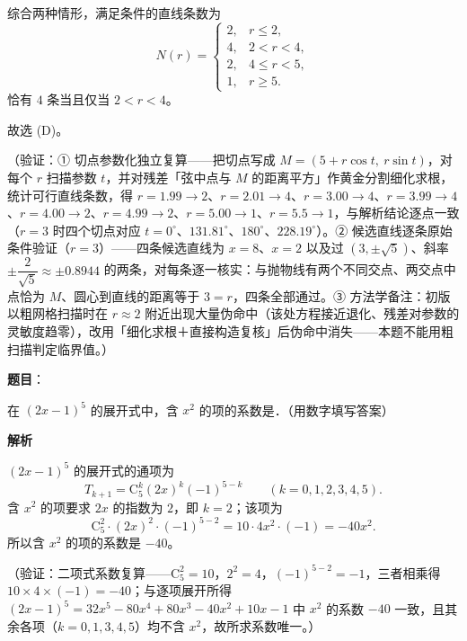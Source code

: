 \begin{answer}
综合两种情形，满足条件的直线条数为
\nopagebreak[4]
\[
N(r)=\begin{cases}
2, & r\leqslant2,\\
4, & 2<r<4,\\
2, & 4\leqslant r<5,\\
1, & r\geqslant5 .
\end{cases}
\]
恰有 \(4\) 条当且仅当 \(2<r<4\)。

故选 (D)。

（验证：① 切点参数化独立复算——把切点写成 \(M=(5+r\cos t,\ r\sin t)\)，对每个 \(r\) 扫描参数 \(t\)，并对残差「弦中点与 \(M\) 的距离平方」作黄金分割细化求根，统计可行直线条数，得 \(r=1.99\to2\)、\(r=2.01\to4\)、\(r=3.00\to4\)、\(r=3.99\to4\)、\(r=4.00\to2\)、\(r=4.99\to2\)、\(r=5.00\to1\)、\(r=5.5\to1\)，与解析结论逐点一致（\(r=3\) 时四个切点对应 \(t=0^{\circ}\)、\(131.81^{\circ}\)、\(180^{\circ}\)、\(228.19^{\circ}\)）。② 候选直线逐条原始条件验证（\(r=3\)）——四条候选直线为 \(x=8\)、\(x=2\) 以及过 \((3,\pm\sqrt{5})\)、斜率 \(\pm\dfrac{2}{\sqrt{5}}\approx\pm0.8944\) 的两条，对每条逐一核实：与抛物线有两个不同交点、两交点中点恰为 \(M\)、圆心到直线的距离等于 \(3=r\)，四条全部通过。③ 方法学备注：初版以粗网格扫描时在 \(r\approx2\) 附近出现大量伪命中（该处方程接近退化、残差对参数的灵敏度趋零），改用「细化求根＋直接构造复核」后伪命中消失——本题不能用粗扫描判定临界值。）


\end{answer}
\begin{answer}

\textbf{题目}：

在 \((2x-1)^5\) 的展开式中，含 \(x^2\) 的项的系数是\gkblank{}．（用数字填写答案）

\textbf{解析}

\((2x-1)^5\) 的展开式的通项为
\nopagebreak[4]
\[
T_{k+1}=\mathrm{C}_5^k(2x)^k(-1)^{5-k}\qquad(k=0,1,2,3,4,5).
\]
含 \(x^2\) 的项要求 \(2x\) 的指数为 \(2\)，即 \(k=2\)；该项为
\nopagebreak[4]
\[
\mathrm{C}_5^2\cdot(2x)^2\cdot(-1)^{5-2}=10\cdot4x^2\cdot(-1)=-40x^2.
\]
所以含 \(x^2\) 的项的系数是 \(-40\)。

（验证：二项式系数复算——\(\mathrm{C}_5^2=10\)，\(2^2=4\)，\((-1)^{5-2}=-1\)，三者相乘得 \(10\times4\times(-1)=-40\)；与逐项展开所得 \((2x-1)^5=32x^5-80x^4+80x^3-40x^2+10x-1\) 中 \(x^2\) 的系数 \(-40\) 一致，且其余各项（\(k=0,1,3,4,5\)）均不含 \(x^2\)，故所求系数唯一。）


\end{answer}
